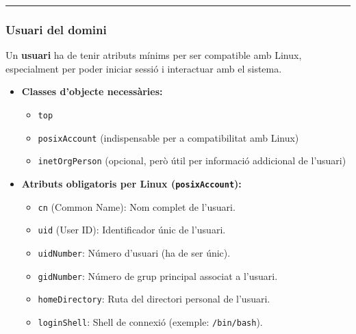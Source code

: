 \documentclass[
  12 pt,
  a4paper,
]{article}
\providecommand{\tightlist}{%
  \setlength{\itemsep}{0pt}\setlength{\parskip}{0pt}}
\begin{document}
\begin{center}\rule{0.5\linewidth}{0.5pt}\end{center}

\subsubsection{Usuari del domini}\label{usuari-del-domini}

Un \textbf{usuari} ha de tenir atributs mínims per ser compatible amb
Linux, especialment per poder iniciar sessió i interactuar amb el
sistema.

\begin{itemize}
\tightlist
\item
  \textbf{Classes d'objecte necessàries:}

  \begin{itemize}
  \tightlist
  \item
    \texttt{top}
  \item
    \texttt{posixAccount} (indispensable per a compatibilitat amb Linux)
  \item
    \texttt{inetOrgPerson} (opcional, però útil per informació
    addicional de l'usuari)
  \end{itemize}
\item
  \textbf{Atributs obligatoris per Linux (\texttt{posixAccount}):}

  \begin{itemize}
  \tightlist
  \item
    \texttt{cn} (Common Name): Nom complet de l'usuari.
  \item
    \texttt{uid} (User ID): Identificador únic de l'usuari.
  \item
    \texttt{uidNumber}: Número d'usuari (ha de ser únic).
  \item
    \texttt{gidNumber}: Número de grup principal associat a l'usuari.
  \item
    \texttt{homeDirectory}: Ruta del directori personal de l'usuari.
  \item
    \texttt{loginShell}: Shell de connexió (exemple:
    \texttt{/bin/bash}).
  \end{itemize}
\end{itemize}
\end{document}
